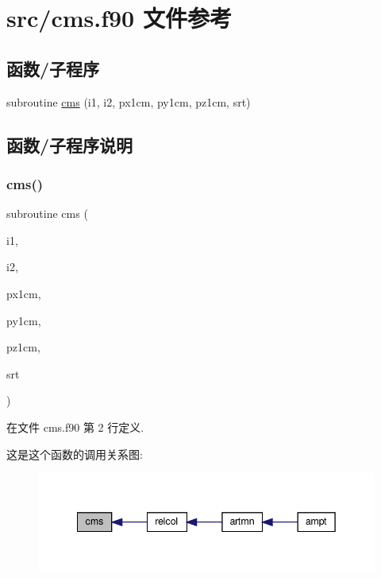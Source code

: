 \hypertarget{cms_8f90}{}\section{src/cms.f90 文件参考}
\label{cms_8f90}
\subsection*{函数/子程序}
\begin{DoxyCompactItemize}
\item 
subroutine \mbox{\hyperlink{cms_8f90_a7b3c6a25b543c3c708e85043c5a6a543}{cms}} (i1, i2, px1cm, py1cm, pz1cm, srt)
\end{DoxyCompactItemize}


\subsection{函数/子程序说明}
\mbox{\label{cms_8f90_a7b3c6a25b543c3c708e85043c5a6a543}} 
\subsubsection{\texorpdfstring{cms()}{cms()}}
{\footnotesize\ttfamily subroutine cms (\begin{DoxyParamCaption}\item[{}]{i1,  }\item[{}]{i2,  }\item[{}]{px1cm,  }\item[{}]{py1cm,  }\item[{}]{pz1cm,  }\item[{}]{srt }\end{DoxyParamCaption})}



在文件 cms.\+f90 第 2 行定义.

这是这个函数的调用关系图\+:
\nopagebreak
\begin{figure}[H]
\begin{center}
\leavevmode
\includegraphics[width=342pt]{cms_8f90_a7b3c6a25b543c3c708e85043c5a6a543_icgraph}
\end{center}
\end{figure}

